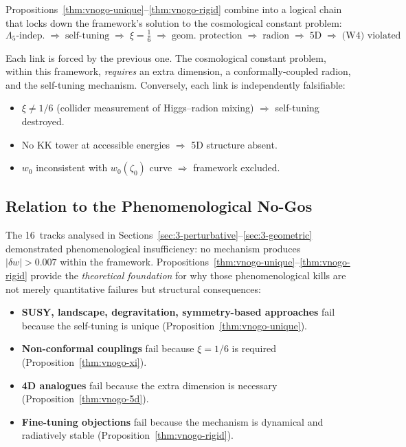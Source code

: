 Propositions~\ref{thm:vnogo-unique}--\ref{thm:vnogo-rigid} combine into a logical chain that locks down the framework's solution to the cosmological constant problem:
\begin{equation}
  \boxed{
  \Lambda_5\text{-indep.} \;\Longrightarrow\;
  \text{self-tuning} \;\Longrightarrow\;
  \xi = \tfrac{1}{6} \;\Longrightarrow\;
  \text{geom.\ protection} \;\Longrightarrow\;
  \text{radion} \;\Longrightarrow\;
  \text{5D} \;\Longrightarrow\;
  \text{(W4) violated}
  }
  \label{eq:3-necessity-chain}
\end{equation}

Each link is forced by the previous one. The cosmological constant problem, within this framework, \emph{requires} an extra dimension, a conformally-coupled radion, and the self-tuning mechanism. Conversely, each link is independently falsifiable:
\begin{itemize}
  \item $\xi \neq 1/6$ (collider measurement of Higgs--radion mixing) $\Longrightarrow$ self-tuning destroyed.
  \item No KK tower at accessible energies $\Longrightarrow$ 5D structure absent.
  \item $w_0$ inconsistent with $w_0(\zeta_0)$ curve $\Longrightarrow$ framework excluded.
\end{itemize}

\subsection{Relation to the Phenomenological No-Gos}
\label{sec:3-vnogo-relation}

The 16~tracks analysed in Sections~\ref{sec:3-perturbative}--\ref{sec:3-geometric} demonstrated phenomenological insufficiency: no mechanism produces $|\delta w| > 0.007$ within the framework. Propositions~\ref{thm:vnogo-unique}--\ref{thm:vnogo-rigid} provide the \emph{theoretical foundation} for why those phenomenological kills are not merely quantitative failures but structural consequences:

\begin{itemize}
  \item \textbf{SUSY, landscape, degravitation, symmetry-based approaches} fail because the self-tuning is unique (Proposition~\ref{thm:vnogo-unique}).
  \item \textbf{Non-conformal couplings} fail because $\xi = 1/6$ is required (Proposition~\ref{thm:vnogo-xi}).
  \item \textbf{4D analogues} fail because the extra dimension is necessary (Proposition~\ref{thm:vnogo-5d}).
  \item \textbf{Fine-tuning objections} fail because the mechanism is dynamical and radiatively stable (Proposition~\ref{thm:vnogo-rigid}).
\end{itemize}

